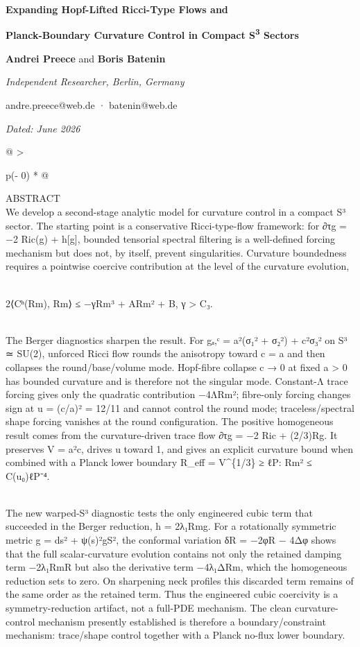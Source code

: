 \documentclass[
]{article}
\author{}
\date{}
\begin{document}
\textbf{Expanding Hopf-Lifted Ricci-Type Flows and}

\textbf{Planck-Boundary Curvature Control in Compact S\textsuperscript{3} Sectors}

\textbf{Andrei Preece} and \textbf{Boris Batenin}

\emph{Independent Researcher, Berlin, Germany}

andre.preece@web.de · batenin@web.de

\emph{Dated: June 2026}

\begin{longtable}[]{@{}
  >{\raggedright\arraybackslash}p{(\columnwidth - 0\tabcolsep) * }@{}}
\toprule\noalign{}
\endhead
\bottomrule\noalign{}
\endlastfoot
\begin{minipage}[t]{\linewidth}\raggedright
ABSTRACT\\
We develop a second-stage analytic model for curvature control in a compact S³ sector. The starting point is a conservative Ricci-type-flow framework: for ∂τg = −2 Ric(g) + h{[}g{]}, bounded tensorial spectral filtering is a well-defined forcing mechanism but does not, by itself, prevent singularities. Curvature boundedness requires a pointwise coercive contribution at the level of the curvature evolution,\\
\strut \\
2⟨Cʰ(Rm), Rm⟩ ≤ −γ\textbar Rm\textbar³ + A\textbar Rm\textbar² + B, γ \textgreater{} C₃.\\
\strut \\
The Berger diagnostics sharpen the result. For gₐ,ᶜ = a²(σ₁² + σ₂²) + c²σ₃² on S³ ≃ SU(2), unforced Ricci flow rounds the anisotropy toward c = a and then collapses the round/base/volume mode. Hopf-fibre collapse c → 0 at fixed a \textgreater{} 0 has bounded curvature and is therefore not the singular mode. Constant-Λ trace forcing gives only the quadratic contribution −4Λ\textbar Rm\textbar²; fibre-only forcing changes sign at u = (c/a)² = 12/11 and cannot control the round mode; traceless/spectral shape forcing vanishes at the round configuration. The positive homogeneous result comes from the curvature-driven trace flow ∂τg = −2 Ric + (2/3)Rg. It preserves V = a²c, drives u toward 1, and gives an explicit curvature bound when combined with a Planck lower boundary R\_eff = V\^{}\{1/3\} ≥ ℓP: \textbar Rm\textbar² ≤ C(u₀)ℓP⁻⁴.\\
\strut \\
The new warped-S³ diagnostic tests the only engineered cubic term that succeeded in the Berger reduction, h = 2λ₁\textbar Rm\textbar g. For a rotationally symmetric metric g = ds² + ψ(s)²gS², the conformal variation δR = −2φR − 4Δφ shows that the full scalar-curvature evolution contains not only the retained damping term −2λ₁\textbar Rm\textbar R but also the derivative term −4λ₁Δ\textbar Rm\textbar, which the homogeneous reduction sets to zero. On sharpening neck profiles this discarded term remains of the same order as the retained term. Thus the engineered cubic coercivity is a symmetry-reduction artifact, not a full-PDE mechanism. The clean curvature-control mechanism presently established is therefore a boundary/constraint mechanism: trace/shape control together with a Planck no-flux lower boundary.\strut

\end{minipage}
\end{longtable}
\end{document}
